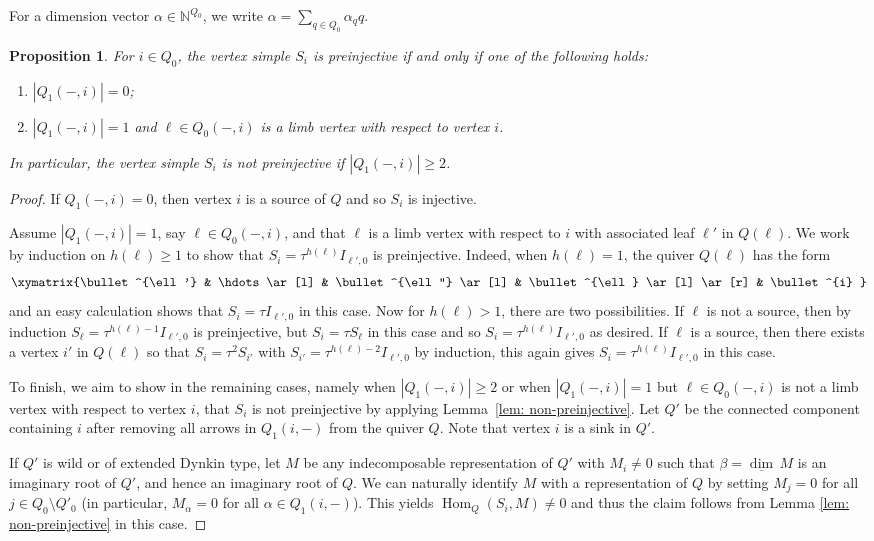 \documentclass{amsart}
\newtheorem{proposition}[theorem]{Proposition}
\numberwithin{equation}{section}
\newcommand{\NN}{\mathbb{N}}
\newcommand\udim{{\underline{\dim}\, }}
\newcommand{\Hom}{\operatorname{Hom}}
\begin{document}
For a dimension vector $\alpha\in\NN^{Q_0}$, we write $\alpha=\sum_{q\in Q_0}\alpha_q q$.
\begin{proposition}
  \label{pro:simpleregular}
  For $i\in Q_0$, the vertex simple $S_i$ is preinjective if and only if one of the following holds: 
  \begin{enumerate}
    \item $|Q_1(-,i)|=0$;
    \item $|Q_1(-,i)|=1$ and $\ell\in Q_0(-,i)$ is a limb vertex with respect to vertex $i$.
  \end{enumerate}
  In particular, the vertex simple $S_i$ is not preinjective if $|Q_1(-,i)|\geq 2$.			
\end{proposition}
\begin{proof}
  If $Q_1(-,i)=0$, then vertex $i$ is a source of $Q$ and so $S_i$ is injective.

  Assume $|Q_1(-,i)|=1$, say $\ell\in Q_0(-,i)$, and that $\ell$ is a limb vertex with respect to $i$ with associated leaf $\ell'$ in $Q(\ell)$.
  We work by induction on $h(\ell)\ge1$ to show that $S_i=\tau^{h(\ell)}I_{\ell',0}$ is preinjective.
  Indeed, when $h(\ell)=1$, the quiver $Q(\ell)$ has the form
  \[\xymatrix{\bullet^{\ell'} & \hdots \ar[l] & \bullet^{\ell''} \ar[l] & \bullet^{\ell} \ar[l] \ar[r] & \bullet^{i} }\]
  and an easy calculation shows that $S_i=\tau I_{\ell',0}$ in this case.
  Now for $h(\ell)>1$, there are two possibilities.
  If $\ell$ is not a source, then by induction $S_\ell=\tau^{h(\ell)-1}I_{\ell',0}$ is preinjective, but $S_i=\tau S_\ell$ in this case and so $S_i=\tau^{h(\ell)}I_{\ell',0}$ as desired.
  If $\ell$ is a source, then there exists a vertex $i'$ in $Q(\ell)$ so that $S_i=\tau^2 S_{i'}$ with $S_{i'}=\tau^{h(\ell)-2} I_{\ell',0}$ by induction, this again gives $S_i=\tau^{h(\ell)} I_{\ell',0}$ in this case.

  To finish, we aim to show in the remaining cases, namely when $|Q_1(-,i)|\ge2$ or when $|Q_1(-,i)|=1$ but $\ell\in Q_0(-,i)$ is not a limb vertex with respect to vertex $i$, that $S_i$ is not preinjective by applying Lemma~\ref{lem: non-preinjective}. 
  Let $Q'$ be the connected component containing $i$ after removing all arrows in $Q_1(i,-)$ from the quiver $Q$.
  Note that vertex $i$ is a sink in $Q'$.

  If $Q'$ is wild or of extended Dynkin type, let $M$ be any indecomposable representation of $Q'$ with $M_i\neq 0$ such that $\beta=\udim M$ is an imaginary root of $Q'$, and hence an imaginary root of $Q$. 
  We can naturally identify $M$ with a representation of $Q$ by setting $M_j=0$ for all $j\in Q_0\setminus Q'_0$ (in particular, $M_\alpha=0$ for all $\alpha\in Q_1(i,-)$).
  This yields $\Hom_Q(S_i,M)\neq 0$ and thus the claim follows from Lemma \ref{lem: non-preinjective} in this case. 


\end{proof}
\end{document}
